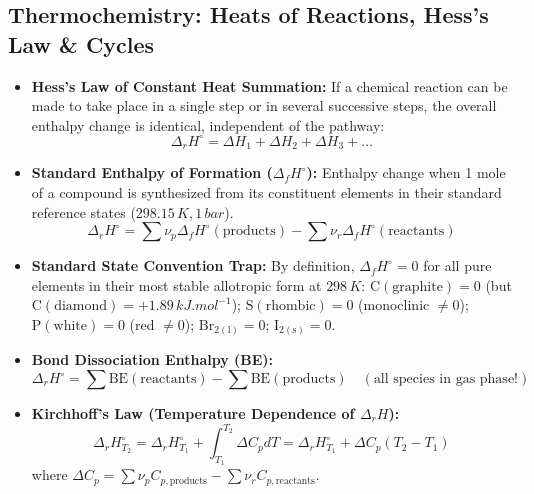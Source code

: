 \documentclass[10pt,twoside,openright]{book}
\begin{document}
\subsection{Thermochemistry: Heats of Reactions, Hess's Law \& Cycles}
\begin{conceptbox}
\begin{itemize}
  \item \textbf{Hess's Law of Constant Heat Summation:} If a chemical reaction can be made to take place in a single step or in several successive steps, the overall enthalpy change is identical, independent of the pathway:
  \begin{equation}
    \Delta_r H^\circ = \Delta H_1 + \Delta H_2 + \Delta H_3 + \dots
  \end{equation}
  \item \textbf{Standard Enthalpy of Formation ($\Delta_f H^\circ$):} Enthalpy change when 1 mole of a compound is synthesized from its constituent elements in their standard reference states ($298.15\,\si{K}, 1\,\si{bar}$).
  \begin{equation}
    \Delta_r H^\circ = \sum \nu_p \Delta_f H^\circ(\text{products}) - \sum \nu_r \Delta_f H^\circ(\text{reactants})
  \end{equation}
  \item \textbf{Standard State Convention Trap:} By definition, $\Delta_f H^\circ = 0$ for all pure elements in their most stable allotropic form at $298\,\si{K}$: $\mathrm{C(\text{graphite})} = 0$ (but $\mathrm{C(\text{diamond})} = +1.89\,\si{kJ.mol^{-1}}$); $\mathrm{S(\text{rhombic})} = 0$ (monoclinic $\ne 0$); $\mathrm{P(\text{white})} = 0$ (red $\ne 0$); $\mathrm{Br_{2(l)}} = 0$; $\mathrm{I_{2(s)}} = 0$.
  \item \textbf{Bond Dissociation Enthalpy (BE):}
  \begin{equation}
    \Delta_r H^\circ = \sum \text{BE}(\text{reactants}) - \sum \text{BE}(\text{products}) \quad (\text{all species in gas phase!})
  \end{equation}
  \item \textbf{Kirchhoff's Law (Temperature Dependence of $\Delta_r H$):}
  \begin{equation}
    \Delta_r H_{T_2}^\circ = \Delta_r H_{T_1}^\circ + \int_{T_1}^{T_2} \Delta C_p dT = \Delta_r H_{T_1}^\circ + \Delta C_p (T_2 - T_1)
  \end{equation}
  where $\Delta C_p = \sum \nu_p C_{p,\text{products}} - \sum \nu_r C_{p,\text{reactants}}$.
\end{itemize}
\end{conceptbox}
\end{document}

